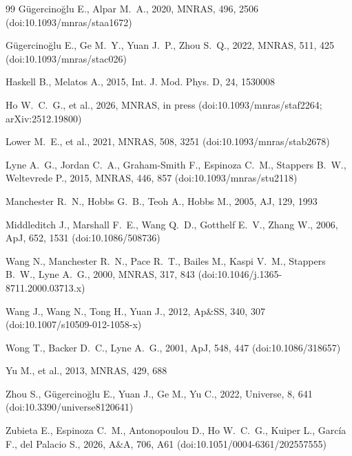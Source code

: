 \documentclass[fleqn,usenatbib]{mnras}
\newcommand{\mnrasref}[2]{MNRAS, #1, #2}
\begin{document}
\begin{thebibliography}{99}
G\"ugercino\u{g}lu E., Alpar M.~A., 2020, \mnrasref{496}{2506}
(doi:10.1093/mnras/staa1672)

G\"ugercino\u{g}lu E., Ge M.~Y., Yuan J.~P., Zhou S.~Q., 2022,
\mnrasref{511}{425} (doi:10.1093/mnras/stac026)

Haskell B., Melatos A., 2015, Int. J. Mod. Phys. D, 24, 1530008

Ho W.~C.~G., et al., 2026, MNRAS, in press (doi:10.1093/mnras/staf2264;
arXiv:2512.19800)

Lower M.~E., et al., 2021, \mnrasref{508}{3251} (doi:10.1093/mnras/stab2678)

Lyne A.~G., Jordan C.~A., Graham-Smith F., Espinoza C.~M., Stappers B.~W.,
Weltevrede P., 2015, \mnrasref{446}{857} (doi:10.1093/mnras/stu2118)

Manchester R.~N., Hobbs G.~B., Teoh A., Hobbs M., 2005, AJ, 129, 1993

Middleditch J., Marshall F.~E., Wang Q.~D., Gotthelf E.~V., Zhang W., 2006,
ApJ, 652, 1531 (doi:10.1086/508736)

Wang N., Manchester R.~N., Pace R.~T., Bailes M., Kaspi V.~M., Stappers
B.~W., Lyne A.~G., 2000, \mnrasref{317}{843}
(doi:10.1046/j.1365-8711.2000.03713.x)

Wang J., Wang N., Tong H., Yuan J., 2012, Ap\&SS, 340, 307
(doi:10.1007/s10509-012-1058-x)

Wong T., Backer D.~C., Lyne A.~G., 2001, ApJ, 548, 447 (doi:10.1086/318657)

Yu M., et al., 2013, \mnrasref{429}{688}

Zhou S., G\"ugercino\u{g}lu E., Yuan J., Ge M., Yu C., 2022, Universe, 8,
641 (doi:10.3390/universe8120641)

Zubieta E., Espinoza C.~M., Antonopoulou D., Ho W.~C.~G., Kuiper L.,
Garc\'ia F., del Palacio S., 2026, A\&A, 706, A61
(doi:10.1051/0004-6361/202557555)
\end{thebibliography}
\end{document}
